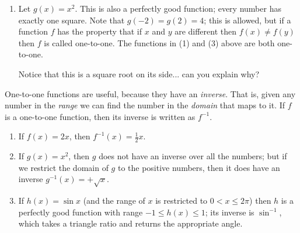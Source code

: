 \begin{ex}
\begin{enumerate}
\begin{center}
{}
          \end{center}
    \clearpage
    \item Let $ g(x) = x^2 $. This is also a perfectly good function; every number has exactly one square. Note that $ g(-2) = g(2) = 4 $;
          this is allowed, but if a function $ f $ has the property that if $ x $ and $ y $ are different then $ f(x) \neq f(y) $ then $ f $
          is called one-to-one. The functions in (1) and (3) above are both one-to-one.
          \begin{center}
          \end{center}
          Notice that this is a square root on its side... can you explain why?
  \end{enumerate}
\end{ex}

One-to-one functions are useful, because they have an \emph{inverse}. That is, given any number in the \emph{range} we can find
the number in the \emph{domain} that maps to it. If $ f $ is a one-to-one function, then its inverse is written as $ f^{-1} $.

\begin{ex}\leavevmode
  \begin{enumerate}
    \item If $ f(x) = 2x $, then $ f^{-1}(x) = \frac{1}{2} x $.
    \item If $ g(x) = x^2 $, then $ g $ does not have an inverse over all the numbers; but if we restrict the domain of $ g $ to
          the positive numbers, then it does have an inverse $ g^{-1}(x) = +\sqrt{x} $.
    \item If $ h(x) = \sin x $ (and the range of $ x $ is restricted to $ 0 < x \leq 2\pi $) then $ h $ is a perfectly good function
          with range $ -1 \leq h(x) \leq 1 $; its inverse is $ \sin^{-1} $, which takes a triangle ratio and returns the appropriate angle.
  \end{enumerate}
\end{ex}

